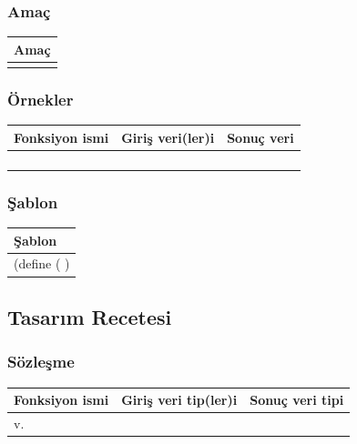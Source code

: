 \documentclass[12pt, a4paper]{article}
\newcommand\fillin[1][3cm]{\makebox[#1]{\dotfill}}
\begin{document}
\subsubsection*{Amaç}
\begin{tabular}{| p{17cm} |  }
\hline			
Amaç\\
\hline
 \\[10ex]
\hline  
\end{tabular}

\subsubsection*{Örnekler}
\begin{tabular}{| p{4cm} | p{8cm} | p{4cm} |  }
\hline			
Fonksiyon ismi&Giriş veri(ler)i&Sonuç veri\\
\hline
& & \\[6ex]
\hline  
& & \\[6ex]
\hline  
& & \\[6ex]
\hline  
& & \\[6ex]
\hline  
\end{tabular}

\subsubsection*{Şablon}
\begin{tabular}{| p{17cm} |  }
\hline			
Şablon\\
\hline
\vspace{0,5cm}
\vspace{0,2cm}
(define (\fillin[2cm] \hspace{1cm}  \fillin[8cm] ) \\[30ex]
\hline  
\end{tabular}






\newpage
\subsection*{Tasarım Recetesi}
\subsubsection*{Sözleşme}
\begin{tabular}{| p{4cm} | p{8cm} | p{4cm} |  }
\hline			
Fonksiyon ismi&Giriş veri tip(ler)i&Sonuç veri tipi\\
\hline
v.& & \\[10ex]
\hline  
\end{tabular}
\end{document}

